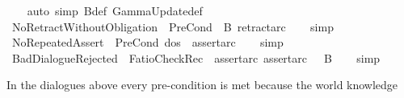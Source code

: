 \begin{isabellebody}
\ \ %
\endisadelimproof
%
\isatagproof
{}\isamarkupfalse%
\ {\isacharparenleft}{\kern0pt}auto\ simp{\isacharcolon}{\kern0pt}\ {\isasymGamma}\isactrlsub B{\isacharunderscore}{\kern0pt}def\ GammaUpdate{\isacharunderscore}{\kern0pt}def{\isacharparenright}{\kern0pt}%
\endisatagproof
{\isafoldproof}%
%
\isadelimproof
\isanewline
%
\endisadelimproof
\isanewline
{}\isamarkupfalse%
\ NoRetractWithoutObligation{\isacharcolon}{\kern0pt}\ {\isachardoublequoteopen}{\isasymnot}\ PreCond\ {\isacharbrackleft}{\kern0pt}{\isacharbrackright}{\kern0pt}\ {\isasymGamma}\isactrlsub B\ retract{\isacharbrackleft}{\kern0pt}a{\isacharcomma}{\kern0pt}r\isactrlsup c{\isacharcomma}{\kern0pt}{\isasymoplus}{\isacharbrackright}{\kern0pt}{\isachardoublequoteclose}\isanewline
%
\isadelimproof
\ \ %
\endisadelimproof
%
\isatagproof
{}\isamarkupfalse%
\ simp%
\endisatagproof
{\isafoldproof}%
%
\isadelimproof
\isanewline
%
\endisadelimproof
\isanewline
{}\isamarkupfalse%
\ NoRepeatedAssert{\isacharcolon}{\kern0pt}\ {\isachardoublequoteopen}{\isasymnot}\ PreCond\ dos\ {\isasymGamma}\ assert{\isacharbrackleft}{\kern0pt}a{\isacharcomma}{\kern0pt}r\isactrlsup c{\isacharbrackright}{\kern0pt}{\isachardoublequoteclose}\isanewline
%
\isadelimproof
\ \ %
\endisadelimproof
%
\isatagproof
{}\isamarkupfalse%
\ simp%
\endisatagproof
{\isafoldproof}%
%
\isadelimproof
\isanewline
%
\endisadelimproof
\isanewline
{}\isamarkupfalse%
\ BadDialogueRejected{\isacharcolon}{\kern0pt}\ {\isachardoublequoteopen}{\isasymnot}\ FatioCheckRec\ {\isacharbrackleft}{\kern0pt}\ assert{\isacharbrackleft}{\kern0pt}a{\isacharcomma}{\kern0pt}r\isactrlsup c{\isacharbrackright}{\kern0pt}{\isacharcomma}{\kern0pt}\ assert{\isacharbrackleft}{\kern0pt}a{\isacharcomma}{\kern0pt}r\isactrlsup c{\isacharbrackright}{\kern0pt}\ {\isacharbrackright}{\kern0pt}\ {\isacharbrackleft}{\kern0pt}{\isacharbrackright}{\kern0pt}\ {\isasymGamma}\isactrlsub B{\isachardoublequoteclose}\isanewline
%
\isadelimproof
\ \ %
\endisadelimproof
%
\isatagproof
{}\isamarkupfalse%
\ simp%
\endisatagproof
{\isafoldproof}%
%
\isadelimproof
%
\endisadelimproof
%
\isadelimdocument
%
\endisadelimdocument
%
\isatagdocument
%
\isamarkuptrue%
%
\endisatagdocument
{\isafolddocument}%
%
\isadelimdocument
%
\endisadelimdocument
%
\begin{isamarkuptext}%
In the dialogues above every pre-condition is met because the world knowledge

\end{isamarkuptext}
\end{isabellebody}
